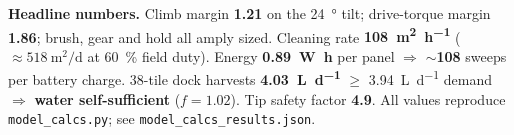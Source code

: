 \documentclass[11pt]{article}
\begin{document}
\vspace{-0.2cm}
\noindent\colorbox{slideblue!8}{\parbox{\dimexpr\linewidth-2\fboxsep}{\small
\textbf{Headline numbers.}
Climb margin \textbf{1.21} on the \SI{24}{\degree} tilt;
drive-torque margin \textbf{1.86}; brush, gear and hold all amply sized.
Cleaning rate \textbf{\SI{108}{\meter\squared\per\hour}}
($\approx\SI{518}{\meter\squared\per\day}$ at \SI{60}{\percent} field duty).
Energy \textbf{\SI{0.89}{\watt\hour}} per panel $\Rightarrow$ \textbf{$\sim$108}
sweeps per battery charge.
\num{38}-tile dock harvests \textbf{\SI{4.03}{\liter\per\day}} $\ge$
\SI{3.94}{\liter\per\day} demand $\Rightarrow$ \textbf{water self-sufficient}
($f=1.02$).
Tip safety factor \textbf{4.9}.
All values reproduce \texttt{model\_calcs.py}; see \texttt{model\_calcs\_results.json}.}}
\end{document}
